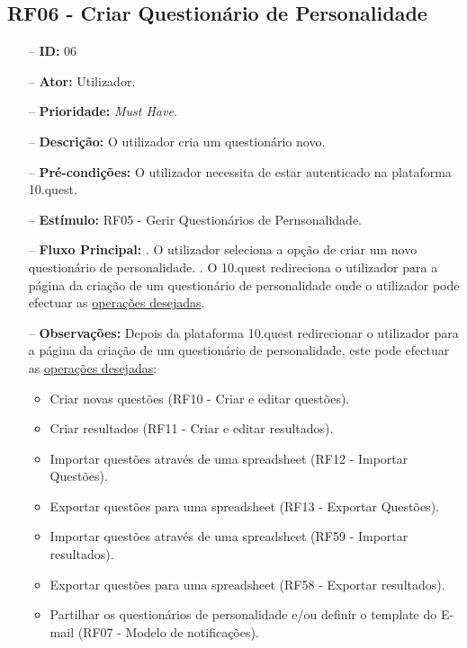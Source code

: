\subsection{RF06 - Criar Questionário de Personalidade}
\begin{itemize}
	\item[--] \textbf{ID:} 06
	\item[--]  \textbf{Ator:} Utilizador.
	\item[--]  \textbf{Prioridade:} \textit{Must Have}.
	\item[--]  \textbf{Descrição:} O utilizador cria um questionário novo.
	\item[--]  \textbf{Pré-condições:} O utilizador necessita de estar autenticado na plataforma 10.quest.
	\item[--]  \textbf{Estímulo:} RF05 - Gerir Questionários de Pernsonalidade.
	\item[--]  \textbf{Fluxo Principal:} 
		. O utilizador seleciona a opção de criar um novo questionário de personalidade.
		. O 10.quest redireciona o utilizador para a página da criação de um questionário de personalidade onde o utilizador pode efectuar as \underline{operações desejadas}.
	\item[--]  \textbf{Observações:} Depois da plataforma 10.quest redirecionar o utilizador para a página da criação de um questionário de personalidade, este pode efectuar as \underline{operações desejadas}:
	\begin{itemize}
		\item Criar novas questões (RF10 - Criar e editar questões).
		\item Criar resultados (RF11 - Criar e editar resultados).
		\item Importar questões através de uma spreadsheet (RF12 - Importar Questões).
		\item Exportar questões para uma spreadsheet (RF13 - Exportar Questões).
		\item Importar questões através de uma spreadsheet (RF59 - Importar resultados).
		\item Exportar questões para uma spreadsheet (RF58 - Exportar resultados).
		\item Partilhar os questionários de personalidade e/ou definir o template do E-mail (RF07 - Modelo de notificações).
	\end{itemize}
\end{itemize}
\newpage

